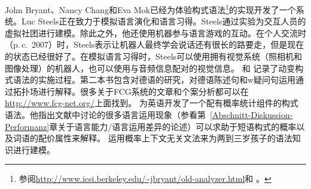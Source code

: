 John Bryant、Nancy Chang和Eva Mok已经为体验构式语法\footnote{%
  参阅\url{http://www.icsi.berkeley.edu/~jbryant/old-analyzer.html}和 。
}的实现开发了一个系统。Luc Steels正在致力于模拟语言演化和语言习得\citep{Steels2003a}。Steels通过实验为交互人员的虚拟社团进行建模。除此之外，他还使用机器参与语言游戏的互动\citep{Steels2015a-u}。在个人交流时（p.\,c.\ 2007）时，Steels表示让机器人最终学会说话还有很长的路要走，但是现在的状态已经很好了。在模拟语言习得时，Steels可以使用拥有视觉系统（照相机和图像处理）的机器人，也可以使用与音频信息配对的视觉信息。 和 记录了动变构式语法的实施过程。第二本书包含对德语的研究，对德语陈述句和w疑问句运用通过拓扑场进行解释\citep{Micelli2012a}。很多关于FCG系统的文章和个案分析都可以在\url{http://www.fcg-net.org/}上面找到。 \citet{Jurafsky96a}为英语开发了一个配有概率统计组件的构式语法。他指出文献中讨论的很多语言运用现象（参看第~\ref{Abschnitt-Diskussion-Performanz}章关于语言能力/语言运用差异的论述）可以求助于短语构式的概率以及词语的配价属性来解释。 \citet*{BLT2009a}运用概率上下文无关文法来为两到三岁孩子的语法知识进行建模。
